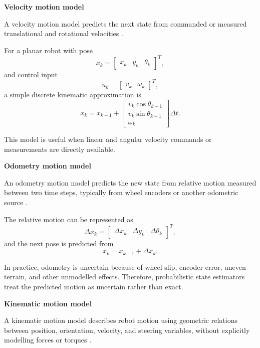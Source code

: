 \documentclass{book}
\providecommand{\ProjectDeepHeading}[2]{%
    \par\medskip\noindent\textbf{#2}\par\smallskip
}
\begin{document}
   \ProjectDeepHeading{10}{Velocity motion model}
      A velocity motion model predicts the next state from commanded or measured translational and rotational velocities \cite{thrun-2005-probabilistic-robotics}.

      For a planar robot with pose
      \[
         x_k =
         \begin{bmatrix}
            x_k & y_k & \ensuremath{\theta}_k
         \end{bmatrix}^{T},
      \]
      and control input
      \[
         u_k =
         \begin{bmatrix}
            v_k & \ensuremath{\omega}_k
         \end{bmatrix}^{T},
      \]
      a simple discrete kinematic approximation is
      \[
         x_k =
         x_{k-1}
         +
         \begin{bmatrix}
            v_k\cos\ensuremath{\theta}_{k-1}\\
            v_k\sin\ensuremath{\theta}_{k-1}\\
            \ensuremath{\omega}_k
         \end{bmatrix}
         \ensuremath{\Delta} t.
      \]

      This model is useful when linear and angular velocity commands or measurements are directly available.

   \ProjectDeepHeading{10}{Odometry motion model}
      An odometry motion model predicts the new state from relative motion measured between two time steps, typically from wheel encoders or another odometric source \cite{thrun-2005-probabilistic-robotics,siegwart-2011-introduction-to-autonomous-mobile-robots}.

      The relative motion can be represented as
      \[
         \ensuremath{\Delta} x_k =
         \begin{bmatrix}
            \ensuremath{\Delta} x_k &
            \ensuremath{\Delta} y_k &
            \ensuremath{\Delta} \ensuremath{\theta}_k
         \end{bmatrix}^{T},
      \]
      and the next pose is predicted from
      \[
         x_k = x_{k-1} + \ensuremath{\Delta} x_k.
      \]

      In practice, odometry is uncertain because of wheel slip, encoder error, uneven terrain, and other unmodelled effects. Therefore, probabilistic state estimators treat the predicted motion as uncertain rather than exact.

   \ProjectDeepHeading{10}{Kinematic motion model}
      A kinematic motion model describes robot motion using geometric relations between position, orientation, velocity, and steering variables, without explicitly modelling forces or torques \cite{siegwart-2011-introduction-to-autonomous-mobile-robots,siciliano-2016-springer-handbook-of-robotics}.
\end{document}
